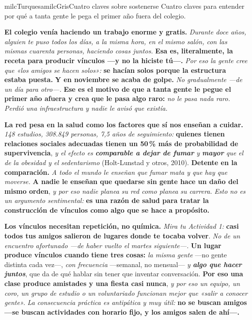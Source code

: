 \documentclass[11pt,letterpaper]{article}
\newcommand{\milcpaso}[3]{%
\Needspace{4\baselineskip}%
\begin{tcolorbox}[enhanced,colback=white,colframe=milcLinea,arc=1.5mm,boxrule=.9pt,
  left=14mm,right=4mm,top=3mm,bottom=3mm,before skip=4pt,after skip=4pt,
  fontupper=\RaggedRight,
  overlay={\node[anchor=north west,circle,fill=#2,text=white,inner sep=0pt,
    minimum size=7.4mm,font=\sffamily\bfseries\small]
    at ([xshift=3.6mm,yshift=-3.2mm]frame.north west) {#1};}]
#3
\end{tcolorbox}}
\begin{document}
\begin{softbox}{milcTurquesa}{milcGris}{Cuatro claves sobre sostenerse}
Cuatro claves para entender por qué a tanta gente le pega el primer año fuera del colegio.
\end{softbox}

\milcpaso{1}{milcTurquesa}{\textbf{El colegio venía haciendo un trabajo enorme y gratis.} \emph{Durante doce años, alguien te puso todos los días, a la misma hora, en el mismo salón, con las mismas cuarenta personas, haciendo cosas juntos.} \textbf{Esa es, literalmente, la receta para producir vínculos ---y no la hiciste tú---.} \emph{Por eso la gente cree que «los amigos se hacen solos»:} \textbf{se hacían solos porque la estructura estaba puesta.} \textbf{Y en noviembre se acaba de golpe.} \emph{No gradualmente ---de un día para otro---.} \textbf{Ese es el motivo de que a tanta gente le pegue el primer año afuera y crea que le pasa algo raro:} \emph{no le pasa nada raro. Perdió una infraestructura y nadie le avisó que existía.}}
\milcpaso{2}{milcTurquesa}{\textbf{La red pesa en la salud como los factores que sí nos enseñan a cuidar.} \emph{148 estudios, 308.849 personas, 7,5 años de seguimiento:} \textbf{quienes tienen relaciones sociales adecuadas tienen un 50\,\% más de probabilidad de supervivencia}, \emph{y el efecto es \textbf{comparable a dejar de fumar} y \textbf{mayor} que el de la obesidad y el sedentarismo} (Holt-Lunstad y otros, 2010). \textbf{Detente en la comparación.} \emph{A todo el mundo le enseñan que fumar mata y que hay que moverse.} \textbf{A nadie le enseñan que quedarse sin gente hace un daño del mismo orden}, \emph{y por eso nadie planea su red como planea su carrera.} \emph{Esto no es un argumento sentimental:} \textbf{es una razón de salud para tratar la construcción de vínculos como algo que se hace a propósito.}}
\milcpaso{3}{milcTurquesa}{\textbf{Los vínculos necesitan repetición, no química.} \emph{Mira tu Actividad 1:} \textbf{casi todos tus amigos salieron de lugares donde te tocaba volver}. \emph{No de un encuentro afortunado ---de haber vuelto el martes siguiente---.} \textbf{Un lugar produce vínculos cuando tiene tres cosas:} \emph{la misma gente} ---no gente distinta cada vez---, \emph{con frecuencia} ---semanal, no mensual--- \emph{y \textbf{algo que hacer juntos}}, que da de qué hablar sin tener que inventar conversación. \textbf{Por eso una clase produce amistades y una fiesta casi nunca}, \emph{y por eso un equipo, un coro, un grupo de estudio o un voluntariado funcionan mejor que «salir a conocer gente».} \emph{La consecuencia práctica es antipática y muy útil:} \textbf{no se buscan amigos ---se buscan actividades con horario fijo, y los amigos salen de ahí---.}}
\end{document}

